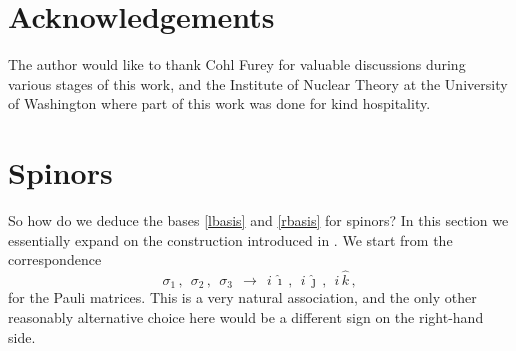 \documentclass[epsfig,12pt]{article}
\newcommand{\ii}{\hat\imath}
\newcommand{\jj}{\hat\jmath}
\newcommand{\kk}{\hat k}
\begin{document}
\section*{Acknowledgements}

	The author would like to thank Cohl Furey for valuable discussions during various stages
	of this work,
	and the Institute of Nuclear Theory at the University of Washington where part of this work
	was done for kind hospitality.




\pagebreak
\appendix
\setcounter{equation}{0}


\section{Spinors}
\label{section-spinors}

	So how do we deduce the bases \eqref{lbasis} and \eqref{rbasis} for spinors?
	In this section we essentially expand on the construction introduced in \cite{thesis}.
	We start from the correspondence
\begin{equation}
	\sigma_1\,,~~ \sigma_2\,,~~ \sigma_3	~~\to~~		i\,\ii\,,~~ i\,\jj\,,~~ i\,\kk\,,
\end{equation}
	for the Pauli matrices.
	This is a very natural association, and the only other reasonably alternative choice here
	would be a different sign on the right-hand side.
\end{document}
